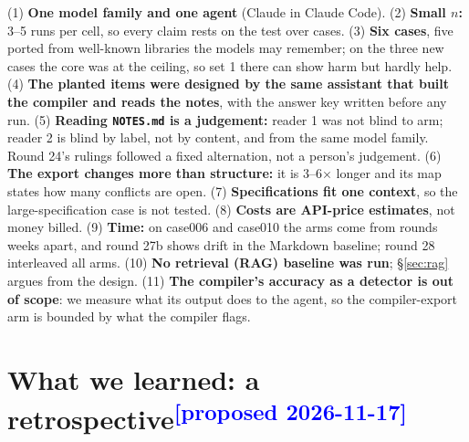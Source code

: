 \documentclass{article}
\newcommand{\proposed}{\textcolor{blue}{\textsuperscript{[proposed 2026-11-17]}}}
\newcommand{\code}[1]{\texttt{#1}}
\begin{document}
(1) \textbf{One model family and one agent} (Claude in Claude Code). (2) \textbf{Small $n$:} 3--5 runs per
cell, so every claim rests on the test over cases. (3) \textbf{Six cases}, five ported from well-known
libraries the models may remember; on the three new cases the core was at the ceiling, so set 1 there can
show harm but hardly help. (4) \textbf{The planted items were designed by the same assistant that built the
compiler and reads the notes}, with the answer key written before any run. (5) \textbf{Reading
\code{NOTES.md} is a judgement:} reader 1 was not blind to arm; reader 2 is blind by label, not by content,
and from the same model family. Round 24's rulings followed a fixed alternation, not a person's
judgement. (6) \textbf{The export changes more than structure:} it is 3--6$\times$ longer and its map states how
many conflicts are open. (7) \textbf{Specifications fit one context}, so the large-specification case is not
tested. (8) \textbf{Costs are API-price estimates}, not money billed. (9) \textbf{Time:} on case006 and
case010 the arms come from rounds weeks apart, and round 27b shows drift in the Markdown baseline; round 28
interleaved all arms. (10) \textbf{No retrieval (RAG) baseline was run}; \S\ref{sec:rag} argues from the
design. (11) \textbf{The compiler's accuracy as a detector is out of scope}: we measure what its output
does to the agent, so the compiler-export arm is bounded by what the compiler flags.

\section{What we learned: a retrospective\proposed}\label{sec:retro}
\end{document}
